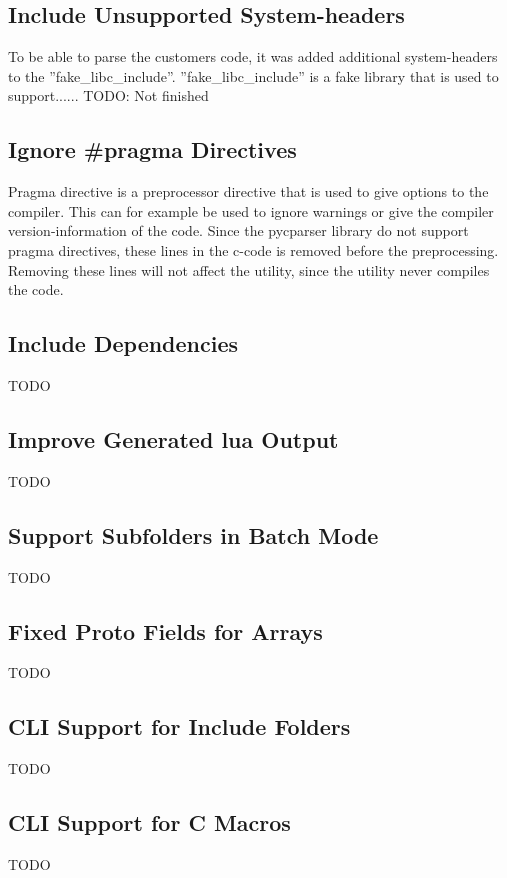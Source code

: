 \subsection{Include Unsupported System-\glspl{header}}
To be able to parse the customers code, it was added additional 
system-headers to the ''fake\_libc\_include''. ''fake\_libc\_include'' is a fake 
library that is used to support...... 
TODO:  Not finished

\subsection{Ignore \#pragma Directives}
Pragma directive is a preprocessor directive that is used to give options to 
the compiler. This can for example be used to ignore warnings or give the 
compiler version-information of the code. Since the pycparser library do not 
support pragma directives, these lines in the c-code is removed before the 
preprocessing. Removing these lines will not affect the utility, since the 
utility never compiles the code.

\subsection{Include Dependencies}
TODO

\subsection{Improve Generated \Gls{lua} Output}
TODO

\subsection{Support Subfolders in Batch Mode}
TODO

\subsection{Fixed Proto Fields for Arrays}
TODO

\subsection{CLI Support for Include Folders}
TODO

\subsection{CLI Support for C Macros}
TODO

